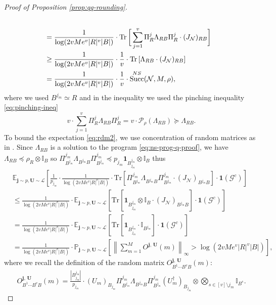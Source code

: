 \documentclass[a4paper,onecolumn,11pt,accepted=2025-10-01]{quantumarticle}
\DeclareMathOperator{\suc}{Succ}
\newcommand*{\bid}{\mathbf{1}}
\newcommand*{\cG}{\mathcal{G}}
\newcommand*{\dI}{\mathbb{I}}
\newcommand*{\cN}{\mathcal{N}}
\newcommand*{\cL}{\mathcal{L}}
\newcommand*{\cP}{\mathcal{P}}
\newcommand*{\tr}[1]{\mathrm{Tr}\left[#1\right]}
\newcommand*{\mge}{\succcurlyeq}
\newcommand*{\mle}{\preccurlyeq}
\newcommand*{\exs}[2]{\mathbb{E}_{#1}\left[#2 \right]}
\begin{document}
\begin{proof}[Proof of Proposition \ref{prop:qq-rounding}]
\begin{align}
    \\&= \frac{1}{\log(2v M e^{v}|R|^{v}|B|)}\cdot \operatorname{Tr}\bigg[ \sum_{j=1}^{v} \Pi^{j}_R \Lambda_{R B} \Pi^{j}_R \cdot(J_{\cN})_{RB} \bigg]
    \\&\ge \frac{1}{\log(2v M e^{v}|R|^{v}|B|)}\cdot \frac{1}{v}\cdot \tr{ \Lambda_{R B}  \cdot (J_{\cN})_{RB} }
    \\&= \frac{1}{\log(2v M e^{v}|R|^{v}|B|)}\cdot\frac{1}{v}\cdot\suc_{}^{\rm{NS}}(\cN, M, \rho),\label{eq:event1}
\end{align}
where we used $B^{j_m} \simeq R$ and  in the  inequality we used the pinching inequality \eqref{eq:pinching-ineq}
\begin{equation}
  v \cdot \sum_{j=1}^{v} \Pi^{j}_R \Lambda_{R B} \Pi^{j}_R = v \cdot \cP_{\rho}(\Lambda_{R B}) \mge \Lambda_{R B}.  
\end{equation}
To bound the expectation  \eqref{eq:rdm2}, we use concentration of random matrices as  in \cite{Fawzi19}.  Since $\Lambda_{RB}$ is a  solution to the program 
    \eqref{eq:ns-prog-q-proof}, we have $ \Lambda_{RB} \mle \rho_R \otimes  \mathbb{I}_B$ so $ \Pi_{B^{j_m}}^{j_m} \Lambda_{B^{j_m} B} \Pi_{B^{j_m}}^{j_m}\mle p_{j_m} \mathbf{1}_{B^{j_m}_{j_m}}\otimes \dI_B $ thus
\begin{align}
    &\exs{\bm{j}\sim p, \bm{U}\sim \cL}{\frac{1}{p_{j_m}}\cdot\frac{1}{\log(2v M e^{v}|R|^{v}|B|)}\cdot \tr{ \Pi_{B^{j_m}}^{j_m} \Lambda_{B^{j_m} B} \Pi_{B^{j_m}}^{j_m} \cdot(J_{\cN})_{B^{j_m} B} }\cdot \bid(\cG^c)}
    \\&\le \frac{1}{\log(2v M e^{v}|R|^{v}|B|)}\cdot\exs{\bm{j}\sim p, \bm{U}\sim \cL}{\tr{ \mathbf{1}_{B^{j_m}_{j_m}}\otimes \dI_B \cdot(J_{\cN})_{B^{j_m} B} }\cdot \bid(\cG^c)}
     \\&= \frac{1}{\log(2v M e^{v}|R|^{v}|B|)}\cdot\exs{\bm{j}\sim p, \bm{U}\sim \cL}{\tr{ \mathbf{1}_{B^{j_m}_{j_m}} \cdot \dI_{B^{j_m} } }\cdot \bid(\cG^c)}
    \\&= \frac{1}{\log(2v M e^{v}|R|^{v}|B|)}\cdot
    \mathbb{P}_{\bm{j}\sim p, \bm{U}\sim \cL} \left[\left\|\textstyle\sum_{m=1}^M O^{\bm{j}, \, \bm{U}}(m)\right\|_{\infty} >\log(2v M e^{v}|R|^{v}|B|)\right],\label{eq:event2}
\end{align}
where we recall the definition of the random matrix $O^{\bm{j}, \, \bm{U}}_{B^1 \cdots B^{v}B}(m)$:
\begin{align}
   O^{\bm{j}, \, \bm{U}}_{B^1 \cdots B^{v}B}(m) = \frac{|B_{j_m}^{j_m}|}{p_{j_m}}\cdot (U_m)_{B_{j_m}}\Pi_{B^{j_m}}^{j_m} \Lambda_{B^{j_m} B} \Pi_{B^{j_m}}^{j_m}(U_m^\dagger)_{B_{j_m}} \otimes \bigotimes_{s\in [v]\setminus j_m} \dI_{B^s}.

\end{align}
\end{proof}
\end{document}
